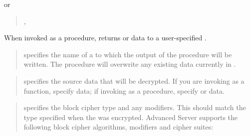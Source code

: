 \documentclass[letterpaper,10pt,english,openany,oneside]{sphinxmanual}
\begin{document}
or
\begin{quote}

\begin{DUlineblock}{0em}
\item[] 
\item[]
\begin{DUlineblock}{\DUlineblockindent}
\item[] ,
\item[] 
\end{DUlineblock}
\end{DUlineblock}
\end{quote}

When invoked as a procedure,  returns  or  data to a
user-specified .


\begin{quote}

 specifies the name of a  to which the output of the
 procedure will be written. The  procedure will
overwrite any existing data currently in .
\end{quote}

\begin{quote}

 specifies the source data that will be decrypted. If you are
invoking  as a function, specify  data; if invoking
 as a procedure, specify  or  data.
\end{quote}

\begin{quote}

 specifies the block cipher type and any modifiers. This should
match the type specified when the  was encrypted. Advanced
Server supports the following block cipher algorithms, modifiers and
cipher suites:
\end{quote}
\end{document}
